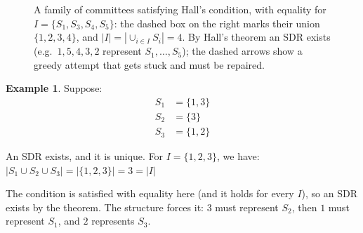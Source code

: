 \documentclass{article}
\theoremstyle{definition}
\newtheorem{example}{Example}
\begin{document}
\begin{figure}[ht]
\caption{A family of committees satisfying Hall's condition, with equality for $I = \{S_1, S_3, S_4, S_5\}$: the dashed box on the right marks their union $\{1, 2, 3, 4\}$, and $|I| = |\cup_{i \in I} S_i| = 4$. By Hall's theorem an SDR exists (e.g.\ $1, 5, 4, 3, 2$ represent $S_1, \ldots, S_5$); the dashed arrows show a greedy attempt that gets stuck and must be repaired.}
\label{fig:sdr-equality}
\end{figure}

\pagebreak
\newpage
\clearpage

\begin{example}
Suppose:
\begin{align*}
S_1 &= \{1,3\} \\
S_2 &= \{3\} \\
S_3 &= \{1,2\}
\end{align*}

An SDR exists, and it is unique. For $I = \{1,2,3\}$, we have:
$|S_1\cup S_2\cup S_3| = |\{1,2,3\}| = 3 = |I|$

The condition is satisfied with equality here (and it holds for every $I$), so an SDR exists by the theorem. The structure forces it: $3$ must represent $S_2$, then $1$ must represent $S_1$, and $2$ represents $S_3$.
\end{example}
\end{document}
